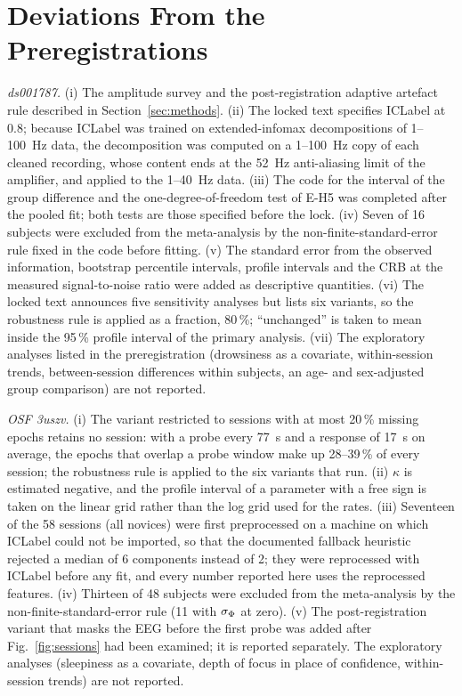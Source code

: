 \appendices

\section{Deviations From the Preregistrations}
\label{app:deviations}
\textit{ds001787.} (i) The amplitude survey and the post-registration adaptive artefact rule described in Section~\ref{sec:methods}. (ii) The locked text specifies ICLabel at 0.8; because ICLabel was trained on extended-infomax decompositions of 1--100~Hz data, the decomposition was computed on a 1--100~Hz copy of each cleaned recording, whose content ends at the 52~Hz anti-aliasing limit of the amplifier, and applied to the 1--40~Hz data. (iii) The code for the interval of the group difference and the one-degree-of-freedom test of E-H5 was completed after the pooled fit; both tests are those specified before the lock. (iv) Seven of 16 subjects were excluded from the meta-analysis by the non-finite-standard-error rule fixed in the code before fitting. (v) The standard error from the observed information, bootstrap percentile intervals, profile intervals and the CRB at the measured signal-to-noise ratio were added as descriptive quantities. (vi) The locked text announces five sensitivity analyses but lists six variants, so the robustness rule is applied as a fraction, 80\,\%; ``unchanged'' is taken to mean inside the 95\,\% profile interval of the primary analysis. (vii) The exploratory analyses listed in the preregistration (drowsiness as a covariate, within-session trends, between-session differences within subjects, an age- and sex-adjusted group comparison) are not reported.

\textit{OSF 3uszv.} (i) The variant restricted to sessions with at most 20\,\% missing epochs retains no session: with a probe every 77~s and a response of 17~s on average, the epochs that overlap a probe window make up 28--39\,\% of every session; the robustness rule is applied to the six variants that run. (ii) $\kappa$ is estimated negative, and the profile interval of a parameter with a free sign is taken on the linear grid rather than the log grid used for the rates. (iii) Seventeen of the 58 sessions (all novices) were first preprocessed on a machine on which ICLabel could not be imported, so that the documented fallback heuristic rejected a median of 6 components instead of 2; they were reprocessed with ICLabel before any fit, and every number reported here uses the reprocessed features. (iv) Thirteen of 48 subjects were excluded from the meta-analysis by the non-finite-standard-error rule (11 with $\sigma_{\Phi}$ at zero). (v) The post-registration variant that masks the EEG before the first probe was added after Fig.~\ref{fig:sessions} had been examined; it is reported separately. The exploratory analyses (sleepiness as a covariate, depth of focus in place of confidence, within-session trends) are not reported.

